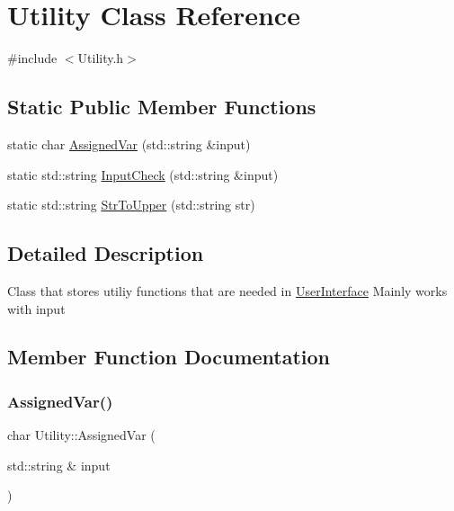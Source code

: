 \hypertarget{class_utility}{}\section{Utility Class Reference}
\label{class_utility}


{\ttfamily \#include $<$Utility.\+h$>$}

\subsection*{Static Public Member Functions}
\begin{DoxyCompactItemize}
\item 
static char \mbox{\hyperlink{class_utility_af9e6f891ac3ef3d533d6f1c76aee1dcf}{Assigned\+Var}} (std\+::string \&input)
\item 
static std\+::string \mbox{\hyperlink{class_utility_a6ff9fad63d7a50296de8bdb927ac9cf3}{Input\+Check}} (std\+::string \&input)
\item 
static std\+::string \mbox{\hyperlink{class_utility_a63b0f47067e0b9dd1104ee27726c6f18}{Str\+To\+Upper}} (std\+::string str)
\end{DoxyCompactItemize}


\subsection{Detailed Description}
Class that stores utiliy functions that are needed in \mbox{\hyperlink{class_user_interface}{User\+Interface}} Mainly works with input 

\subsection{Member Function Documentation}
\mbox{\label{class_utility_af9e6f891ac3ef3d533d6f1c76aee1dcf}} 
\subsubsection{\texorpdfstring{AssignedVar()}{AssignedVar()}}
{\footnotesize\ttfamily char Utility\+::\+Assigned\+Var (\begin{DoxyParamCaption}\item[{std\+::string \&}]{input }\end{DoxyParamCaption})\hspace{0.3cm}{\ttfamily [static]}}


